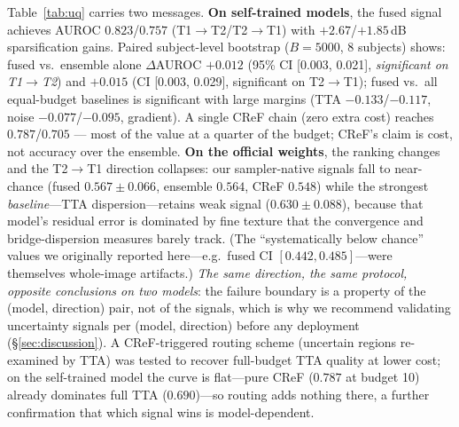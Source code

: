 \documentclass[11pt]{article}
\begin{document}
Table~\ref{tab:uq} carries two messages. \textbf{On self-trained models},
the fused signal achieves AUROC $0.823$/$0.757$ (T1$\to$T2/T2$\to$T1)
with $+2.67$/$+1.85$\,dB sparsification gains. Paired subject-level bootstrap
($B{=}5000$, 8 subjects) shows: fused vs.\ ensemble alone $\Delta$AUROC
$+0.012$ (95\% CI [0.003, 0.021], \emph{significant on T1$\to$T2})
and $+0.015$ (CI [0.003, 0.029], significant on T2$\to$T1);
fused vs.\ all equal-budget baselines is significant with large margins
(TTA $-0.133$/$-0.117$, noise $-0.077$/$-0.095$, gradient). A single CReF
chain (zero extra cost) reaches $0.787$/$0.705$ --- most of the value at a
quarter of the budget; CReF's claim is cost, not accuracy over the ensemble.
\textbf{On the official weights}, the ranking changes and the
T2$\to$T1 direction collapses: our sampler-native signals fall to near-chance
(fused $0.567\pm0.066$, ensemble
$0.564$, CReF $0.548$) while the strongest \emph{baseline}---TTA
dispersion---retains weak signal ($0.630\pm0.088$), because that model's
residual error is dominated by fine texture that the convergence and
bridge-dispersion measures barely track. (The ``systematically below
chance'' values we originally reported here---e.g.\ fused CI $[0.442, 0.485]$---were
themselves whole-image artifacts.) \emph{The same direction, the same protocol, opposite conclusions on
two models}: the failure boundary is a property of the (model, direction)
pair, not of the signals, which is why we recommend validating uncertainty
signals per (model, direction) before any deployment (\S\ref{sec:discussion}).
A CReF-triggered routing scheme (uncertain regions re-examined by TTA) was
tested to recover full-budget TTA quality at lower cost; on the self-trained
model the curve is flat---pure CReF ($0.787$ at budget 10) already dominates
full TTA ($0.690$)---so routing adds nothing there, a further
confirmation that which signal wins is model-dependent.
\end{document}
